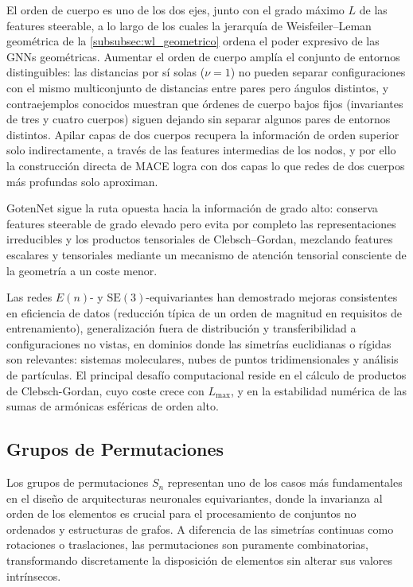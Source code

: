 \begin{remark}\label{rem:orden_cuerpo_expresividad}
El orden de cuerpo es uno de los dos ejes, junto con el grado máximo $L$ de las features steerable, a lo largo de los cuales la jerarquía de Weisfeiler--Leman geométrica de la \autoref{subsubsec:wl_geometrico} ordena el poder expresivo de las \glspl{GNN} geométricas. Aumentar el orden de cuerpo amplía el conjunto de entornos distinguibles: las distancias por sí solas ($\nu = 1$) no pueden separar configuraciones con el mismo multiconjunto de distancias entre pares pero ángulos distintos, y contraejemplos conocidos muestran que órdenes de cuerpo bajos fijos (invariantes de tres y cuatro cuerpos) siguen dejando sin separar algunos pares de entornos distintos. Apilar capas de dos cuerpos recupera la información de orden superior solo indirectamente, a través de las features intermedias de los nodos, y por ello la construcción directa de MACE logra con dos capas lo que redes de dos cuerpos más profundas solo aproximan.
\end{remark}

GotenNet \citep{aykent2025gotennet} sigue la ruta opuesta hacia la información de grado alto: conserva features steerable de grado elevado pero evita por completo las representaciones irreducibles y los productos tensoriales de Clebsch--Gordan, mezclando features escalares y tensoriales mediante un mecanismo de atención tensorial consciente de la geometría a un coste menor.

Las redes $E(n)$- y $\text{SE}(3)$-equivariantes han demostrado mejoras consistentes en eficiencia de datos (reducción típica de un orden de magnitud en requisitos de entrenamiento), generalización fuera de distribución y transferibilidad a configuraciones no vistas, en dominios donde las simetrías euclidianas o rígidas son relevantes: sistemas moleculares, nubes de puntos tridimensionales y análisis de partículas. El principal desafío computacional reside en el cálculo de productos de Clebsch-Gordan, cuyo coste crece con $L_{\max}$, y en la estabilidad numérica de las sumas de armónicas esféricas de orden alto.

\subsection{Grupos de Permutaciones}\label{subsec:grupos_permutaciones}

Los grupos de permutaciones $S_n$ representan uno de los casos más fundamentales en el diseño de arquitecturas neuronales equivariantes, donde la invarianza al orden de los elementos es crucial para el procesamiento de conjuntos no ordenados y estructuras de grafos. A diferencia de las simetrías continuas como rotaciones o traslaciones, las permutaciones son puramente combinatorias, transformando discretamente la disposición de elementos sin alterar sus valores intrínsecos.

